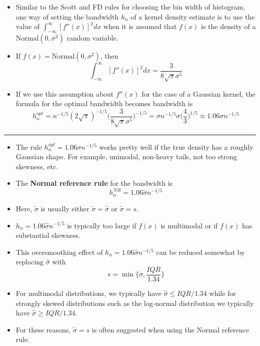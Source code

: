 \documentclass[]{book}
\begin{document}
\begin{itemize}
\item
  Similar to the Scott and FD rules for choosing the bin width of histogram, one way of setting the bandwidth \(h_{n}\)
  of a kernel density estimate is to use the value of \(\int_{-\infty}^{\infty} [f''(x)]^{2} dx\) when it is assumed that
  \(f(x)\) is the density of a \(\textrm{Normal}(0, \sigma^{2})\) random variable.
\item
  If \(f(x) = \textrm{Normal}(0, \sigma^{2})\), then
  \begin{equation}
  \int_{-\infty}^{\infty} [f''(x)]^{2} dx = \frac{3}{8\sqrt{\pi}\sigma^{5}} \nonumber 
  \end{equation}
\item
  If we use this assumption about \(f''(x)\) for the case of a Gaussian kernel, the formula for the optimal bandwidth becomes
  bandwidth is
  \begin{equation}
  h_{n}^{opt} = n^{-1/5}(2\sqrt{\pi})^{-1/5}\Big( \frac{3}{8\sqrt{\pi}\sigma^{5}} \Big)^{-1/5}
  = \sigma n^{-1/5} \sigma \Big( \frac{4}{3} \Big)^{1/5}
  \approx 1.06 \sigma n^{-1/5}
  \end{equation}
\end{itemize}

\begin{center}\rule{0.5\linewidth}{\linethickness}\end{center}

\begin{itemize}
\item
  The rule \(h_{n}^{opt} = 1.06 \sigma n^{-1/5}\) works pretty well if the true density has a roughly Gaussian shape. For example,
  unimodal, non-heavy tails, not too strong skewness, etc.
\item
  The \textbf{Normal reference rule} for the bandwidth is
  \begin{equation}
  h_{n}^{NR} = 1.06 \tilde{\sigma} n^{-1/5}  \nonumber
  \end{equation}
\item
  Here, \(\tilde{\sigma}\) is usually either \(\tilde{\sigma} = \hat{\sigma}\) or \(\tilde{\sigma} = s\).
\item
  \(h_{n} = 1.06 \hat{\sigma} n^{-1/5}\) is typically too large if \(f(x)\) is multimodal or
  if \(f(x)\) has substantial skewness.
\item
  This oversmoothing effect of \(h_{n} = 1.06 \hat{\sigma} n^{-1/5}\) can be reduced somewhat by replacing \(\hat{\sigma}\) with
  \begin{equation}
  s = \min\Big\{ \hat{\sigma}, \frac{IQR}{1.34} \Big\} \nonumber 
  \end{equation}
\item
  For multimodal distributions, we typically have \(\hat{\sigma} \leq IQR/1.34\) while for strongly skewed
  distributions such as the log-normal distribution we typically have \(\hat{\sigma} \geq IQR/1.34\).
\item
  For these reasons, \(\tilde{\sigma} = s\) is often suggested when using the Normal reference rule.
\end{itemize}
\end{document}
